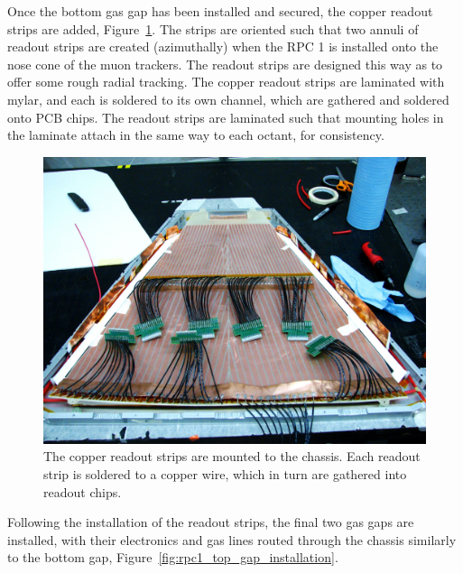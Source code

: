 Once the bottom gas gap has been installed and secured, the copper readout
strips are added, Figure~\ref{fig:rpc1_construction_5}. The strips are oriented
such that two annuli of readout strips are created (azimuthally) when the RPC 1
is installed onto the nose cone of the muon trackers. The readout strips are
designed this way as to offer some rough radial tracking. The copper readout
strips are laminated with mylar, and each is soldered to its own channel, which
are gathered and soldered onto PCB chips. The readout strips are laminated such
that mounting holes in the laminate attach in the same way to each octant, for
consistency.

\begin{figure}
  \centering
  \includegraphics[width=0.7\linewidth]{./figures/rpc1_construction_5}
  \caption{
    The copper readout strips are mounted to the chassis. Each readout strip is
    soldered to a copper wire, which in turn are gathered into readout chips.
  }
  \label{fig:rpc1_construction_5}
\end{figure}

Following the installation of the readout strips, the final two gas gaps are
installed, with their electronics and gas lines routed through the chassis
similarly to the bottom gap, Figure~\ref{fig:rpc1_top_gap_installation}. 

